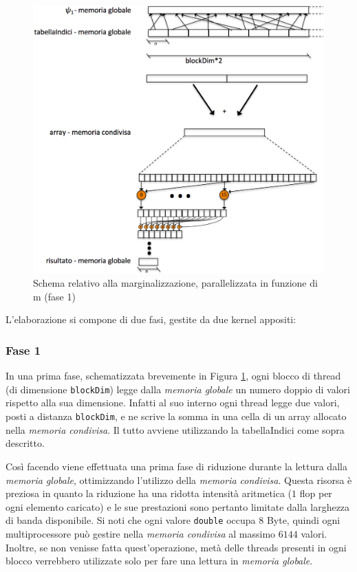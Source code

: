 \documentclass[a4paper]{article}   %
\begin{document}
 \begin{figure}[!h]
\centering
\includegraphics[scale=0.25]{relazionecentrata.png}
\caption{Schema relativo alla marginalizzazione, parallelizzata in funzione di m (fase 1) }
\label{schemafase1}
\end{figure}


L’elaborazione si compone di due fasi, gestite da due kernel appositi:
\subsubsection{Fase 1}
In una prima fase, schematizzata brevemente in Figura \ref{schemafase1}, ogni blocco di thread (di dimensione {\tt blockDim}) legge dalla \emph{memoria globale} un numero doppio di valori rispetto alla sua dimensione. Infatti al suo interno ogni thread legge due valori, posti a distanza {\tt blockDim}, e ne scrive la somma in una cella di un array allocato nella \emph{memoria condivisa}. Il tutto avviene utilizzando la tabellaIndici come sopra descritto.

Così facendo viene effettuata una prima fase di riduzione durante la lettura dalla \emph{memoria globale}, ottimizzando l’utilizzo della \emph{memoria condivisa}. Questa risorsa è preziosa in quanto la riduzione ha una ridotta intensità aritmetica ($1$ flop per ogni elemento caricato) e le sue prestazioni sono pertanto limitate dalla larghezza di banda disponibile. Si noti che ogni valore {\tt double} occupa $8$ Byte, quindi ogni multiprocessore può gestire nella \emph{memoria condivisa} al massimo $6144$ valori.
Inoltre, se non venisse fatta quest’operazione, metà delle threads presenti in ogni blocco verrebbero utilizzate solo per fare una lettura in \emph{memoria globale}. 
\end{document}
